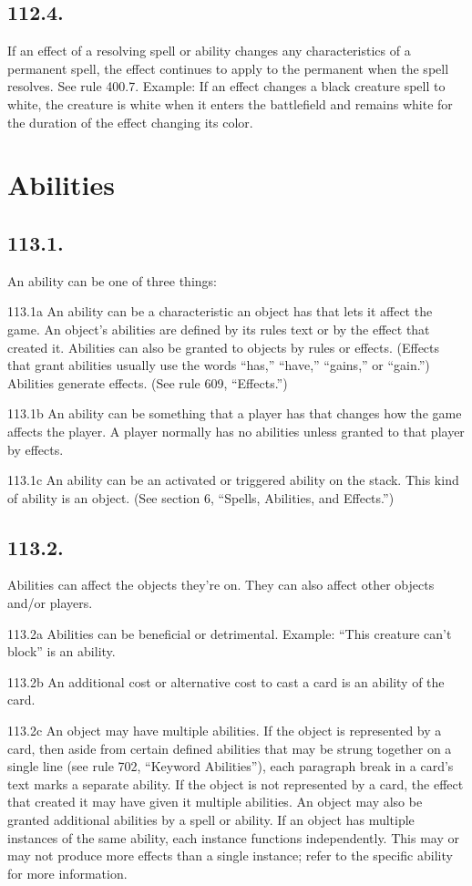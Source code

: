\subsection*{112.4.}
If an effect of a resolving spell or ability changes any characteristics of a permanent spell, the effect continues to apply to the permanent when the spell resolves. See rule 400.7.
Example: If an effect changes a black creature spell to white, the creature is white when it enters the battlefield and remains white for the duration of the effect changing its color.

\section{Abilities}
\subsection*{113.1.}
An ability can be one of three things:

113.1a An ability can be a characteristic an object has that lets it affect the game. An object’s abilities are defined by its rules text or by the effect that created it. Abilities can also be granted to objects by rules or effects. (Effects that grant abilities usually use the words “has,” “have,” “gains,” or “gain.”) Abilities generate effects. (See rule 609, “Effects.”)

113.1b An ability can be something that a player has that changes how the game affects the player. A player normally has no abilities unless granted to that player by effects.

113.1c An ability can be an activated or triggered ability on the stack. This kind of ability is an object. (See section 6, “Spells, Abilities, and Effects.”)

\subsection*{113.2.}
Abilities can affect the objects they’re on. They can also affect other objects and/or players.

113.2a Abilities can be beneficial or detrimental.
Example: “This creature can’t block” is an ability.

113.2b An additional cost or alternative cost to cast a card is an ability of the card.

113.2c An object may have multiple abilities. If the object is represented by a card, then aside from certain defined abilities that may be strung together on a single line (see rule 702, “Keyword Abilities”), each paragraph break in a card’s text marks a separate ability. If the object is not represented by a card, the effect that created it may have given it multiple abilities. An object may also be granted additional abilities by a spell or ability. If an object has multiple instances of the same ability, each instance functions independently. This may or may not produce more effects than a single instance; refer to the specific ability for more information.

